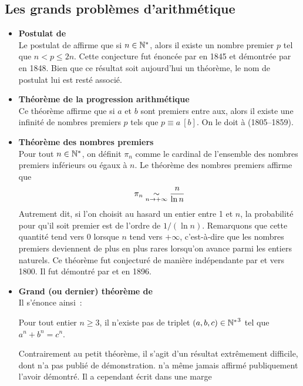 \documentclass{magnolia}
\begin{document}
\subsection{Les grands problèmes d'arithmétique}

\begin{itemize}
\item {\bf Postulat de }\\
  Le postulat de  affirme que si $n\in{\mathbb{N}^*}$, alors il existe un nombre
  premier $p$ tel que $n<p\leq 2n$. Cette conjecture fut énoncée par  en 1845 et démontrée par  en 1848. Bien que ce résultat
  soit aujourd'hui un théorème, le nom de postulat lui est resté associé.
\item {\bf Théorème de la progression arithmétique}\\
  Ce théorème affirme que si $a$ et $b$ sont premiers entre aux, alors il existe
  une infinité de nombres premiers $p$ tels que $p\equiv a\ [b]$. On le doit
  à  (1805--1859).
\item {\bf Théorème des nombres premiers}\\
  Pour tout $n\in{\mathbb{N}^*}$, on définit $\pi_n$ comme le cardinal de l'ensemble des
  nombres premiers inférieurs ou égaux à $n$. Le théorème des nombres premiers
  affirme que
  \[\pi_n\underset{n\rightarrow +\infty}{\sim}\frac{n}{\ln n}\]
  Autrement dit, si l'on choisit au hasard un entier entre 1 et $n$, la
  probabilité pour qu'il soit premier est de l'ordre de $1/(\ln n)$. Remarquons
  que cette quantité tend vers 0 lorsque $n$ tend vers $+\infty$, c'est-à-dire
  que les nombres premiers deviennent \og de plus en plus rares \fg lorsqu'on
  avance parmi les entiers naturels. Ce théorème fut conjecturé de
  manière indépendante par  et  vers 1800. Il fut démontré par
   et  en 1896.
\item {\bf Grand (ou dernier) théorème de }\\
  Il s'énonce ainsi~:
  \medskip
  \begin{center}
  \og \parbox[t]{0.5\linewidth}{%
    Pour tout entier $n\geq 3$, il n'existe pas de triplet $(a,b,c)\in{\mathbb{N}^*}^3$
    tel que $a^n+b^n=c^n$.\fg}
  \end{center}
  \medskip
  Contrairement au petit théorème, il s'agit d'un résultat extrêmement
  difficile, dont  n'a pas publié de démonstration.  n'a même jamais
  affirmé publiquement l'avoir démontré. Il a cependant écrit dans une marge

\end{itemize}
\end{document}
